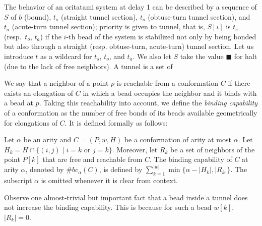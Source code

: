 The behavior of an oritatami system at delay 1 can be described by a sequence of $S$ of $b$ (bound), $t_s$ (straight tunnel section), $t_o$ (obtuse-turn tunnel section), and $t_a$ (acute-turn tunnel section); priority is given to tunnel, that is, $S[i]$ is $t_s$ (resp.~$t_o$, $t_a$) if the $i$-th bead of the system is stabilized not only by being bonded but also through a straight (resp. obtuse-turn, acute-turn) tunnel section. 
Let us introduce $t$ as a wildcard for $t_s$, $t_o$, and $t_a$. 
We also let $S$ take the value $\blacksquare$ for halt (due to the lack of free neighbors). 
A tunnel is a set of 


We say that a neighbor of a point $p$ is reachable from a conformation $C$ if there exists an elongation of $C$ in which a bead occupies the neighbor and it binds with a bead at $p$. 
Taking this reachability into account, we define the \textit{binding capability} of a conformation as the number of free bonds of its beads available geometrically for elongations of $C$.
It is defined formally as follows: 

\begin{definition}
Let $\alpha$ be an arity and $C = (P,w,H)$ be a conformation of arity at most $\alpha$.
Let $H_k = H \cap \{ (i,j) \mid \mbox{$i=k$ or $j=k$} \}$. 
Moreover, let $R_k$ be a set of neighbors of the point $P[k]$ that are free and reachable from $C$.
The binding capability of $C$ at arity $\alpha$, denoted by $\#bc_\alpha(C)$, is defined by $\sum^{|w|}_{k=1} \min \{\alpha-|H_k|, |R_k|\}$.
The subscript $\alpha$ is omitted whenever it is clear from context. 
\end{definition}
%
Observe one almost-trivial but important fact that a bead inside a tunnel does not increase the binding capability. 
This is because for such a bead $w[k]$, $|R_k| = 0$. 

